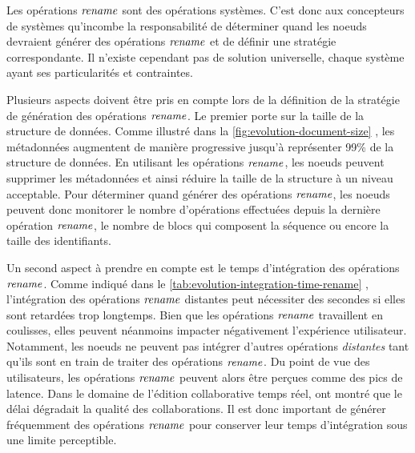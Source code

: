Les opérations $\mathit{rename}$ sont des opérations systèmes.
C'est donc aux concepteurs de systèmes qu'incombe la responsabilité de déterminer quand les noeuds devraient générer des opérations $\mathit{rename}$ et de définir une stratégie correspondante.
Il n'existe cependant pas de solution universelle, chaque système ayant ses particularités et contraintes.

Plusieurs aspects doivent être pris en compte lors de la définition de la stratégie de génération des opérations $\mathit{rename}$.
Le premier porte sur la taille de la structure de données.
Comme illustré dans la \autoref{fig:evolution-document-size} , les métadonnées augmentent de manière progressive jusqu'à représenter 99\% de la structure de données.
En utilisant les opérations $\mathit{rename}$, les noeuds peuvent supprimer les métadonnées et ainsi réduire la taille de la structure à un niveau acceptable.
Pour déterminer quand générer des opérations $\mathit{rename}$, les noeuds peuvent donc monitorer le nombre d'opérations effectuées depuis la dernière opération $\mathit{rename}$, le nombre de blocs qui composent la séquence ou encore la taille des identifiants.

Un second aspect à prendre en compte est le temps d'intégration des opérations $\mathit{rename}$.
Comme indiqué dans le \autoref{tab:evolution-integration-time-rename} , l'intégration des opérations $\mathit{rename}$ distantes peut nécessiter des secondes si elles sont retardées trop longtemps.
Bien que les opérations $\mathit{rename}$ travaillent en coulisses, elles peuvent néanmoins impacter négativement l'expérience utilisateur.
Notamment, les noeuds ne peuvent pas intégrer d'autres opérations \emph{distantes} tant qu'ils sont en train de traiter des opérations $\mathit{rename}$.
Du point de vue des utilisateurs, les opérations $\mathit{rename}$ peuvent alors être perçues comme des pics de latence.
Dans le domaine de l'édition collaborative temps réel, \textcite{2014-effect-delay-collaborative-editing-ignat,2015-cope-delay-collaborative-note-taking-ignat} ont montré que le délai dégradait la qualité des collaborations.
Il est donc important de générer fréquemment des opérations $\mathit{rename}$ pour conserver leur temps d'intégration sous une limite perceptible.


